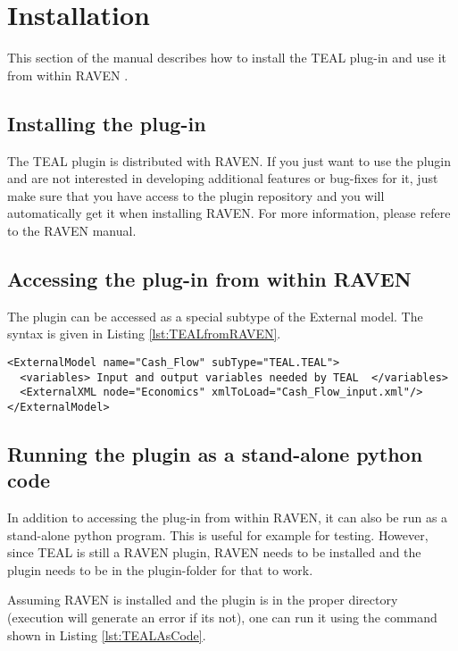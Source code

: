 
\section{Installation}
\label{sec:Installation}

This section of the manual describes how to install the TEAL plug-in and use it from within RAVEN \cite{RAVEN}.

\subsection{Installing the plug-in}
The TEAL plugin is distributed with RAVEN. If you just want to use the plugin and are not interested in developing additional features or bug-fixes for it, just make sure that you have access to the plugin repository and you will automatically get it when installing RAVEN.
For more information, please refere to the RAVEN manual.

\subsection{Accessing the plug-in from within RAVEN}
The plugin can be accessed as a special subtype of the External model. The syntax is given in Listing \ref{lst:TEALfromRAVEN}.

\begin{lstlisting}[style=XML,morekeywords={anAttribute},caption=Call TEAL from RAVEN input., label=lst:TEALfromRAVEN]
<ExternalModel name="Cash_Flow" subType="TEAL.TEAL">
  <variables> Input and output variables needed by TEAL  </variables>
  <ExternalXML node="Economics" xmlToLoad="Cash_Flow_input.xml"/>
</ExternalModel>
\end{lstlisting}

\subsection{Running the plugin as a stand-alone python code}

In addition to accessing the plug-in from within RAVEN, it can also be run as a stand-alone python program. This is useful for example for testing. However, since TEAL is still a RAVEN plugin, RAVEN needs to be installed and the plugin needs to be in the plugin-folder for that to work.

Assuming RAVEN is installed and the plugin is in the proper directory (execution will generate an error if its not), one can run it using the command shown in Listing \ref{lst:TEALAsCode}.

